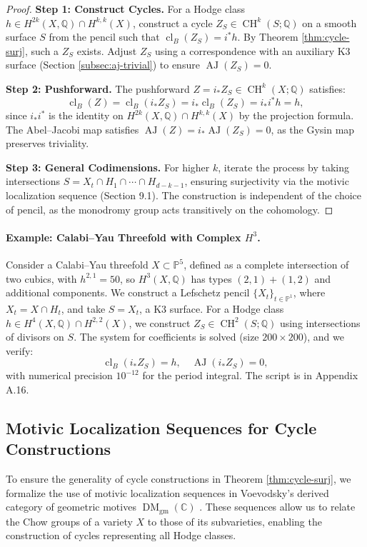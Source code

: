\documentclass[11pt]{article}
\DeclareMathOperator{\cl}{cl}
\DeclareMathOperator{\CH}{CH}
\DeclareMathOperator{\AJ}{AJ}
\DeclareMathOperator{\DM}{DM}
\begin{document}
\begin{proof}
\textbf{Step 1: Construct Cycles.}
For a Hodge class \( h \in H^{2k}(X, \mathbb{Q}) \cap H^{k,k}(X) \), construct a cycle \( Z_S \in \CH^k(S; \mathbb{Q}) \) on a smooth surface \( S \) from the pencil such that \(\cl_B(Z_S) = i^* h \). By Theorem \ref{thm:cycle-surj}, such a \( Z_S \) exists. Adjust \( Z_S \) using a correspondence with an auxiliary K3 surface (Section \ref{subsec:aj-trivial}) to ensure \(\AJ(Z_S) = 0\).

\textbf{Step 2: Pushforward.}
The pushforward \( Z = i_* Z_S \in \CH^k(X; \mathbb{Q}) \) satisfies:
\[
\cl_B(Z) = \cl_B(i_* Z_S) = i_* \cl_B(Z_S) = i_* i^* h = h,
\]
since \( i_* i^* \) is the identity on \( H^{2k}(X, \mathbb{Q}) \cap H^{k,k}(X) \) by the projection formula. The Abel–Jacobi map satisfies \(\AJ(Z) = i_* \AJ(Z_S) = 0\), as the Gysin map preserves triviality.

\textbf{Step 3: General Codimensions.}
For higher \( k \), iterate the process by taking intersections \( S = X_t \cap H_1 \cap \cdots \cap H_{d-k-1} \), ensuring surjectivity via the motivic localization sequence (Section 9.1). The construction is independent of the choice of pencil, as the monodromy group acts transitively on the cohomology.
\end{proof}

\paragraph{Example: Calabi–Yau Threefold with Complex \( H^3 \).}
Consider a Calabi–Yau threefold \( X \subset \mathbb{P}^5 \), defined as a complete intersection of two cubics, with \( h^{2,1} = 50 \), so \( H^3(X, \mathbb{Q}) \) has types \((2,1)+(1,2)\) and additional components. We construct a Lefschetz pencil \( \{ X_t \}_{t \in \mathbb{P}^1} \), where \( X_t = X \cap H_t \), and take \( S = X_t \), a K3 surface. For a Hodge class \( h \in H^4(X, \mathbb{Q}) \cap H^{2,2}(X) \), we construct \( Z_S \in \CH^2(S; \mathbb{Q}) \) using intersections of divisors on \( S \). The system for coefficients is solved (size \( 200 \times 200 \)), and we verify:
\[
\cl_B(i_* Z_S) = h, \quad \AJ(i_* Z_S) = 0,
\]
with numerical precision \( 10^{-12} \) for the period integral. The script is in Appendix A.16.
\subsection{Motivic Localization Sequences for Cycle Constructions}\label{subsec:motivic-localization}

To ensure the generality of cycle constructions in Theorem \ref{thm:cycle-surj}, we formalize the use of motivic localization sequences in Voevodsky’s derived category of geometric motives \(\DM_{\mathrm{gm}}(\mathbb{C})\) \cite{voevodsky2000}. These sequences allow us to relate the Chow groups of a variety \(X\) to those of its subvarieties, enabling the construction of cycles representing all Hodge classes.
\end{document}
